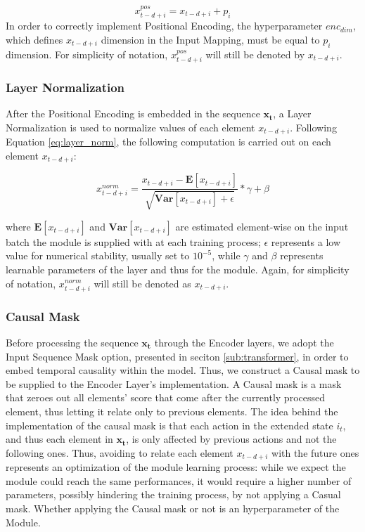                 \[ x_{t-d+i}^{pos} = x_{t-d+i} + p_i \]
                \noindent
                In order to correctly implement Positional Encoding, the hyperparameter $enc_{dim}$, which defines $x_{t-d+i}$ dimension in the Input Mapping, must be equal to $p_i$ dimension. For simplicity of notation, $x_{t-d+i}^{pos}$ will still be denoted by $x_{t-d+i}$.
                
            \subsubsection{Layer Normalization}
                After the Positional Encoding is embedded in the sequence $\mathbf{x_t}$, a Layer Normalization is used to normalize values of each element $x_{t-d+i}$. Following Equation \ref{eq:layer_norm}, the following computation is carried out on each element $x_{t-d+i}$:
                
                \[ x^{norm}_{t-d+i} = \frac{x_{t-d+i} - \mathbf{E} \left[ x_{t-d+i} \right]}{\sqrt{\mathbf{Var} \left[ x_{t-d+i} \right] + \epsilon}} * \gamma + \beta\]
                
                where $\mathbf{E} \left[ x_{t-d+i} \right]$ and $\mathbf{Var} \left[ x_{t-d+i} \right]$ are estimated element-wise on the input batch the module is supplied with at each training process; $\epsilon$ represents a low value for numerical stability, usually set to $10^{-5}$, while $\gamma$ and $\beta$ represents learnable parameters of the layer and thus for the module. Again, for simplicity of notation, $x^{norm}_{t-d+i}$ will still be denoted as $x_{t-d+i}$.
                
            \subsubsection{Causal Mask}
                Before processing the sequence $\mathbf{x_t}$ through the Encoder layers, we adopt the Input Sequence Mask option, presented in seciton \ref{sub:transformer}, in order to embed temporal causality within the model. Thus, we construct a Causal mask to be supplied to the Encoder Layer's implementation. A Causal mask is a mask that zeroes out all elements' score that come after the currently processed element, thus letting it relate only to previous elements. The idea behind the implementation of the causal mask is that each action in the extended state $i_t$, and thus each element in $\mathbf{x_t}$, is only affected by previous actions and not the following ones. Thus, avoiding to relate each element $x_{t-d+i}$ with the future ones represents an optimization of the module learning process: while we expect the module could reach the same performances, it would require a higher number of parameters, possibly hindering the training process, by not applying a Casual mask. Whether applying the Causal mask or not is an hyperparameter of the Module.
                
